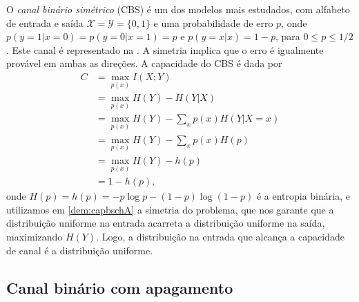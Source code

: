 O \emph{canal binário simétrico} (CBS) é um dos modelos mais estudados, com alfabeto
de entrada e saída $\mathcal{X} = \mathcal{Y} = \{0, 1\}$ e uma probabilidade de erro $p$, onde
$p(y=1|x=0) = p(y=0|x=1) = p$ e $p(y=x|x) = 1-p$, para $0 \leq p \leq 1/2$. 
Este canal é representado na . 
A simetria implica que o erro é igualmente provável em ambas as direções. A
capacidade do CBS é dada por 
\begin{subequations}\label{eq:capbsch}
  \begin{align}
    C &= \max_{p(x)} I(X;Y) \\
      &= \max_{p(x)} H(Y) - H(Y|X) \\
      &= \max_{p(x)} H(Y) - \sum_x p(x) H(Y|X=x) \\
      &= \max_{p(x)} H(Y) - \sum_x p(x) H(p) \\
      &= \max_{p(x)} H(Y) - h(p) \\
      &= 1 - h(p) , \label{dem:capbschA}
  \end{align}
\end{subequations}
onde $H(p) = h(p) = -p \log p - (1-p) \log (1-p)$ é a entropia binária,
e utilizamos em \ref{dem:capbschA} a simetria do problema, que
nos garante que a distribuição uniforme na entrada acarreta
a distribuição uniforme na saída, maximizando $H(Y)$. Logo,
a distribuição na entrada que alcança a capacidade de canal
é a distribuição uniforme.


\subsection{Canal binário com apagamento}

\begin{marginfigure}%
  \centering
  \caption{Canal binário com apagamento.}\label{fig:bech}
\end{marginfigure}

